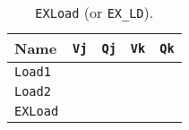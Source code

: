\begin{enumerate}
    \begin{table}[!htp]
        \centering
        \begin{tabular}{@{} l | c c c c @{}}
            \toprule
            Name            & \texttt{Vj}   & \texttt{Qj}   & \texttt{Vk}           & \texttt{Qk}   \\
            \midrule
            \texttt{Load1}  &               &               &                       &               \\ [.3em]
            \texttt{Load2}  &               &               &                       &               \\
            \cmidrule{1-5}
            \texttt{EXLoad} &               &               &                       &               \\
            \bottomrule
        \end{tabular}
        \caption*{\texttt{EXLoad} (or \texttt{EX\_LD}).}
    \end{table}


\end{enumerate}
